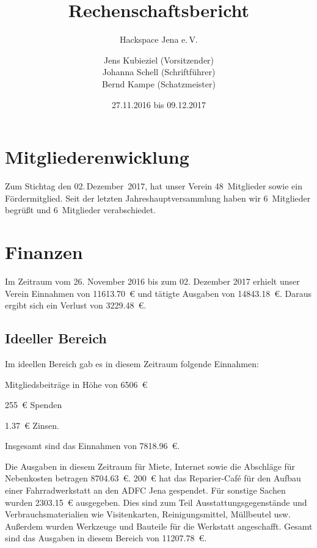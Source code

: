 \documentclass[ngerman]{scrartcl}
\title{Rechenschaftsbericht}
\subtitle{Hackspace Jena e.\,V.}
\author{%
	Jens Kubieziel (Vorsitzender)\\
	Johanna Schell (Schriftführer)\\
	Bernd Kampe (Schatzmeister)
}
\date{27.11.2016 bis 09.12.2017}
\begin{document}
\maketitle{}

\tableofcontents{}

\newpage{}

\section{Mitgliederenwicklung}

Zum Stichtag den 02.\,Dezember~2017, hat unser Verein 48~Mitglieder sowie ein Fördermitglied.
Seit der letzten Jahreshauptversammlung haben wir 6~Mitglieder begrüßt und 6~Mitglieder verabschiedet.


\section{Finanzen}

Im Zeitraum vom 26. November 2016 bis zum 02. Dezember 2017 erhielt unser Verein Einnahmen von \num{11613,70}~\euro{} und tätigte Ausgaben von \num{14843,18}~\euro{}.  %
Daraus ergibt sich ein Verlust von \num{3229,48}~\euro{}. %


\subsection{Ideeller Bereich}
\label{sec:ideeller_bereich}

Im ideellen Bereich gab es in diesem Zeitraum folgende Einnahmen:
\begin{compactitem}
\item Mitgliedsbeiträge in Höhe von \num{6506}~\euro{}
\item \num{255}~\euro{} Spenden
\item \num{1,37}~\euro{} Zinsen. %
\end{compactitem}
Insgesamt sind das Einnahmen von \num{7818,96}~\euro{}. %

Die Ausgaben in diesem Zeitraum für Miete, Internet sowie die Abschläge für Nebenkosten betragen \num{8704,63}~\euro{}.
\num{200}~\euro{} hat das Reparier-Café für den Aufbau einer Fahrradwerkstatt an den ADFC Jena gespendet.
Für sonstige Sachen wurden \num{2303,15}~\euro{} ausgegeben.
Dies sind zum Teil Ausstattungsgegenstände und Verbrauchsmaterialien wie Visitenkarten, Reinigungsmittel, Müllbeutel usw.
Außerdem wurden Werkzeuge und Bauteile für die Werkstatt angeschafft.
Gesamt sind das Ausgaben in diesem Bereich von \num{11207,78}~\euro{}.
\end{document}
